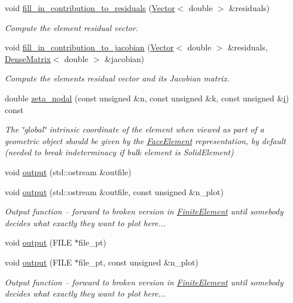 \begin{DoxyCompactItemize}
void \hyperlink{classoomph_1_1LinearWaveFluxElement_a1bc14657ec786579cc01096f42e8c30c}{fill\+\_\+in\+\_\+contribution\+\_\+to\+\_\+residuals} (\hyperlink{classoomph_1_1Vector}{Vector}$<$ double $>$ \&residuals)
\begin{DoxyCompactList}\small\item\em Compute the element residual vector. \end{DoxyCompactList}\item 
void \hyperlink{classoomph_1_1LinearWaveFluxElement_a76f1a46c72f1ba9c18109416967a568f}{fill\+\_\+in\+\_\+contribution\+\_\+to\+\_\+jacobian} (\hyperlink{classoomph_1_1Vector}{Vector}$<$ double $>$ \&residuals, \hyperlink{classoomph_1_1DenseMatrix}{Dense\+Matrix}$<$ double $>$ \&jacobian)
\begin{DoxyCompactList}\small\item\em Compute the element\textquotesingle{}s residual vector and its Jacobian matrix. \end{DoxyCompactList}\item 
double \hyperlink{classoomph_1_1LinearWaveFluxElement_a6fb1a0846c91406e86f598c8eb0fafb2}{zeta\+\_\+nodal} (const unsigned \&n, const unsigned \&k, const unsigned \&\hyperlink{cfortran_8h_adb50e893b86b3e55e751a42eab3cba82}{i}) const
\begin{DoxyCompactList}\small\item\em The \char`\"{}global\char`\"{} intrinsic coordinate of the element when viewed as part of a geometric object should be given by the \hyperlink{classoomph_1_1FaceElement}{Face\+Element} representation, by default (needed to break indeterminacy if bulk element is Solid\+Element) \end{DoxyCompactList}\item 
void \hyperlink{classoomph_1_1LinearWaveFluxElement_ad969d2df96dd76f0cab08ad7a80dda9f}{output} (std\+::ostream \&outfile)
\item 
void \hyperlink{classoomph_1_1LinearWaveFluxElement_ae767010f3b965889d917a4c41f8db956}{output} (std\+::ostream \&outfile, const unsigned \&n\+\_\+plot)
\begin{DoxyCompactList}\small\item\em Output function -- forward to broken version in \hyperlink{classoomph_1_1FiniteElement}{Finite\+Element} until somebody decides what exactly they want to plot here... \end{DoxyCompactList}\item 
void \hyperlink{classoomph_1_1LinearWaveFluxElement_a8c857d40393967eb1e88314ba9efc729}{output} (F\+I\+LE $\ast$file\+\_\+pt)
\item 
void \hyperlink{classoomph_1_1LinearWaveFluxElement_a09230e7c17c744a62ed8d3e317ba1eeb}{output} (F\+I\+LE $\ast$file\+\_\+pt, const unsigned \&n\+\_\+plot)
\begin{DoxyCompactList}\small\item\em Output function -- forward to broken version in \hyperlink{classoomph_1_1FiniteElement}{Finite\+Element} until somebody decides what exactly they want to plot here... \end{DoxyCompactList}\end{DoxyCompactItemize}
